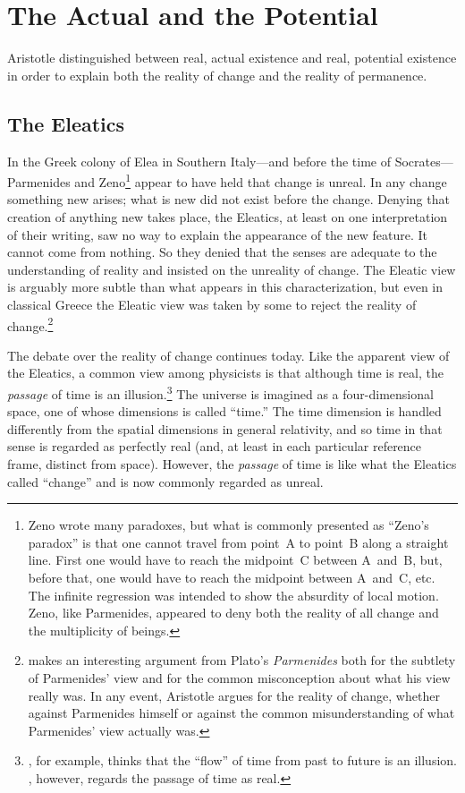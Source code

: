 \documentclass[twocolumn]{article}
\begin{document}
\section{The Actual and the Potential}

Aristotle distinguished between real, actual existence and real, potential
existence in order to explain both the reality of change and the reality of
permanence.

\subsection{The Eleatics}

In the Greek colony of Elea in Southern Italy---and before the time of
Socrates---Parmenides and Zeno\footnote{%
   Zeno wrote many paradoxes, but what is commonly presented as ``Zeno's
   paradox'' is that one cannot travel from point~A to point~B along a straight
   line.  First one would have to reach the midpoint~C between A~and~B, but,
   before that, one would have to reach the midpoint between A~and~C, etc.  The
   infinite regression was intended to show the absurdity of local motion.
   Zeno, like Parmenides, appeared to deny both the reality of all change and
   the multiplicity of beings.%
}
appear to have held that change is unreal.  In any change something new arises;
what is new did not exist before the change.  Denying that creation of anything
new takes place, the Eleatics, at least on one interpretation of their writing,
saw no way to explain the appearance of the new feature. It cannot come from
nothing.  So they denied that the senses are adequate to the understanding of
reality and insisted on the unreality of change.  The Eleatic view is arguably
more subtle than what appears in this characterization, but even in classical
Greece the Eleatic view was taken by some to reject the reality of
change.\footnote{%
   \cite{p2017} makes an interesting argument from Plato's {\it Parmenides}
   both for the subtlety of Parmenides' view and for the common misconception
   about what his view really was.  In any event, Aristotle argues for the
   reality of change, whether against Parmenides himself or against the common
   misunderstanding of what Parmenides' view actually was.%
}

The debate over the reality of change continues today.  Like the apparent view
of the Eleatics, a common view among physicists is that although time is real,
the \emph{passage} of time is an illusion.\footnote{%
   \cite{c2015}, for example, thinks that the ``flow'' of time from past to
   future is an illusion. \cite{s2013}, however, regards the passage of time as
   real.%
}
The universe is imagined as a four-dimensional space, one of whose dimensions
is called ``time.''  The time dimension is handled differently from the spatial
dimensions in general relativity, and so time in that sense is regarded as
perfectly real (and, at least in each particular reference frame, distinct from
space).  However, the \emph{passage} of time is like what the Eleatics called
``change'' and is now commonly regarded as unreal.
\end{document}
